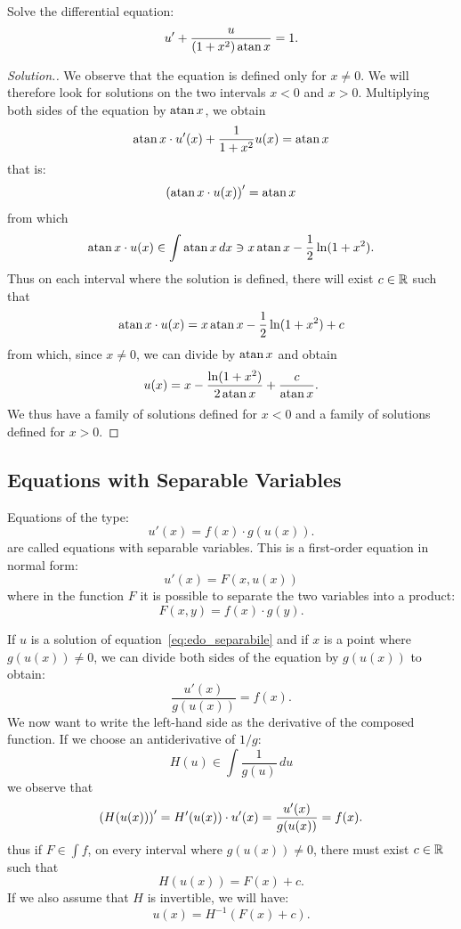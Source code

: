 \begin{exercise}
Solve the differential equation:
\[
 u' + \frac{u}{(1+x^2)\operatorname{atan} x} = 1.
\]
\end{exercise}
%
\begin{proof}[Solution.]
We observe that the equation is defined only for $x\neq 0$. We will therefore
look for solutions on the two intervals $x<0$ and $x>0$.
Multiplying both sides of the equation by $\operatorname{atan} x$, we obtain
\[
  \operatorname{atan} x \cdot u'(x) +\frac{1}{1+x^2} u(x) = \operatorname{atan} x
\]
that is:
\[
  {\left( \operatorname{atan} x \cdot u(x) \right)}' = \operatorname{atan} x
\]
from which
\[
  \operatorname{atan} x \cdot u(x) \in \int \operatorname{atan} x\, dx \ni x \operatorname{atan} x - \frac {1}{2}\ln(1+x^2).
\]
Thus on each interval where the solution is defined, there will exist $c\in {\mathbb R}$
such that
\[
  \operatorname{atan} x \cdot u(x) = x \operatorname{atan} x - \frac{1}{2}\ln(1+x^2) + c
\]
from which, since $x\neq 0$, we can divide by $\operatorname{atan} x$ and obtain
\[
  u(x) = x - \frac{\ln(1+x^2)}{2\operatorname{atan} x} + \frac{c}{\operatorname{atan} x}.
\]
We thus have a family of solutions defined for $x<0$ and a family of solutions
defined for $x>0$.
\end{proof}

\subsection{Equations with Separable Variables}

Equations of the type:
\mymark{***}
\begin{equation}\label{eq:edo_separabile}
  u'(x) = f(x) \cdot g(u(x)).
\end{equation}
are called equations with separable variables.
This is a first-order equation in normal form:
\[
  u'(x) = F(x, u(x))
\]
where in the function $F$ it is possible to separate the two variables into a
product:
\[
  F(x, y) = f(x)\cdot g(y).
\]

If $u$ is a solution of equation~\eqref{eq:edo_separabile} and if $x$ is a point
where $g(u(x))\neq 0$, we can divide both sides of the equation by $g(u(x))$ to
obtain:
\[
  \frac{u'(x)}{g(u(x))} = f(x).
\]
We now want to write the left-hand side as the derivative of the composed
function. If we choose an antiderivative of $1/g$:
\[
  H(u) \in \int \frac{1}{g(u)}\, du
\]
we observe that
\[
  {\left( H(u(x)) \right)}' = H'(u(x))\cdot u'(x) = \frac{u'(x)}{g(u(x))} = f(x).
\]
thus if $F\in \int f$, on every interval where $g(u(x))\neq 0$, there must exist
$c\in {\mathbb R}$ such that
\[
  H(u(x)) = F(x) + c.
\]
If we also assume that $H$ is invertible, we will have:
\[
  u(x) = H^{-1}(F(x)+ c).
\]

